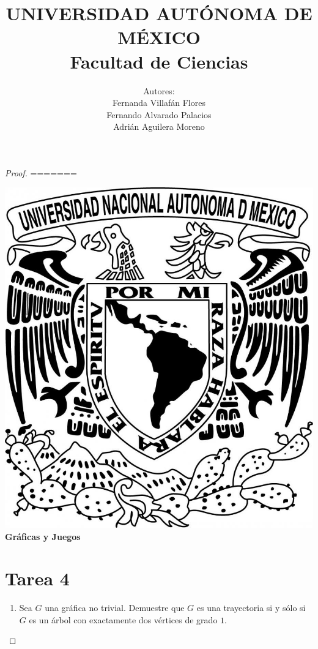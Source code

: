 \documentclass{article}
\begin{document}
\begin{enumerate}
\begin{proof}
      
=======
  \title{UNIVERSIDAD AUT\'ONOMA DE M\'EXICO\\ Facultad de Ciencias}
  \author{Autores:
    \\ Fernanda Villaf\'an Flores
    \\ Fernando Alvarado Palacios
    \\ Adri\'an Aguilera Moreno}
  \date{}
  \maketitle
  \begin{center}
    \includegraphics[scale=0.20]{../Imagen/Portada.jpg}\\[0.4cm]
    \Large
    \bf{Gr\'aficas y Juegos}
    \normalsize
  \end{center}
  \newpage
  \section*{\LARGE{Tarea 4}}

  \begin{enumerate}
    \item Sea $G$ una gr\'afica no trivial.   Demuestre
      que $G$ es una trayectoria si y s\'olo si $G$ es
      un \'arbol con exactamente dos v\'ertices de
      grado $1$.


\end{enumerate}
\end{proof}
\end{enumerate}
\end{document}
